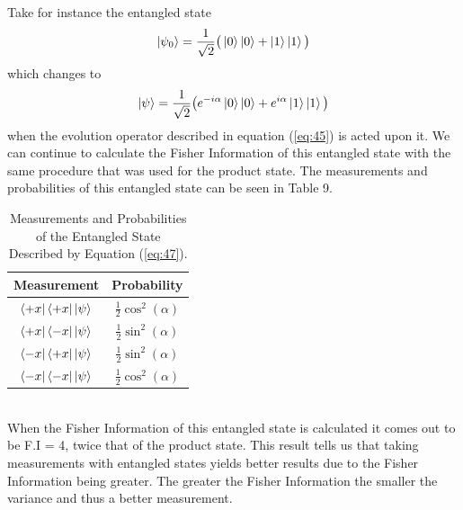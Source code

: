 \documentclass[twocolumn]{article}
\begin{document}
Take for instance the entangled state
\begin{equation} \label{eq:51}
\ket{\psi_0}=\frac{1}{\sqrt{2}}\big(\ket{0}\ket{0}+\ket{1}\ket{1}\big)
\end{equation}
which changes to 
\begin{equation} \label{eq:52}
\ket{\psi}=\frac{1}{\sqrt{2}}\big(e^{-i\alpha}\ket{0}\ket{0}+e^{i\alpha}\ket{1}\ket{1}\big)
\end{equation}
when the evolution operator described in equation (\ref{eq:45}) is acted upon it. We can continue to calculate the Fisher Information of this entangled state with the same procedure that was used for the product state. The measurements and probabilities of this entangled state can be seen in Table 9.
\begin{table}[h!]
\begin{center}
\begin{tabular}{ |c|c| }
\hline Measurement & Probability \\
\hline $\bra{+x}\bra{+x}\ket{\psi}$ & $\frac{1}{2}\cos^2{(\alpha)}$ \\
\hline $\bra{+x}\bra{-x}\ket{\psi}$ & $\frac{1}{2}\sin^2{(\alpha)}$ \\
\hline $\bra{-x}\bra{+x}\ket{\psi}$ & $\frac{1}{2}\sin^2{(\alpha)}$ \\
\hline $\bra{-x}\bra{-x}\ket{\psi}$ & $\frac{1}{2}\cos^2{(\alpha)}$ \\
\hline
\end{tabular}
\caption{Measurements and Probabilities of the Entangled State Described by Equation (\ref{eq:47}).}
\end{center}
\end{table} \\
When the Fisher Information of this entangled state is calculated it comes out to be F.I = 4, twice that of the product state. This result tells us that taking measurements with entangled states yields better results due to the Fisher Information being greater. The greater the Fisher Information the smaller the variance and thus a better measurement.
\end{document}
